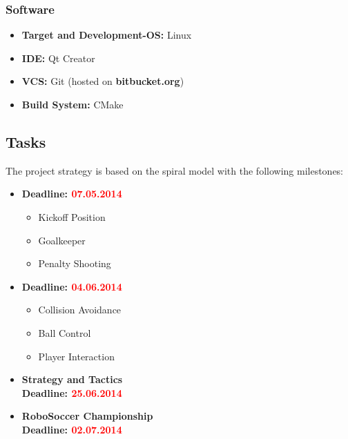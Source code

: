 \documentclass[12pt]{article}
\begin{document}
\subsubsection*{Software}
\begin{itemize}
	\item \textbf{Target and Development-OS:} Linux
	\item \textbf{IDE:} Qt Creator
	\item \textbf{VCS:} Git (hosted on \textbf{bitbucket.org})
	\item \textbf{Build System:} CMake
\end{itemize}

\subsection{Tasks}
The project strategy is based on the spiral model with the following milestones:
\begin{itemize}
	\item \textbf{Deadline: \textcolor{red}{07.05.2014}}
	\begin{itemize}
		\item Kickoff Position
		\item Goalkeeper
		\item Penalty Shooting
	\end{itemize}
	
	\item \textbf{Deadline: \textcolor{red}{04.06.2014}}
	\begin{itemize}
		\item Collision Avoidance
		\item Ball Control
		\item Player Interaction
	\end{itemize}
	
	\item \textbf{Strategy and Tactics}\\
	\textbf{Deadline: \textcolor{red}{25.06.2014}}
	
	\item \textbf{RoboSoccer Championship}\\
	\textbf{Deadline: \textcolor{red}{02.07.2014}}
\end{itemize}
\end{document}
